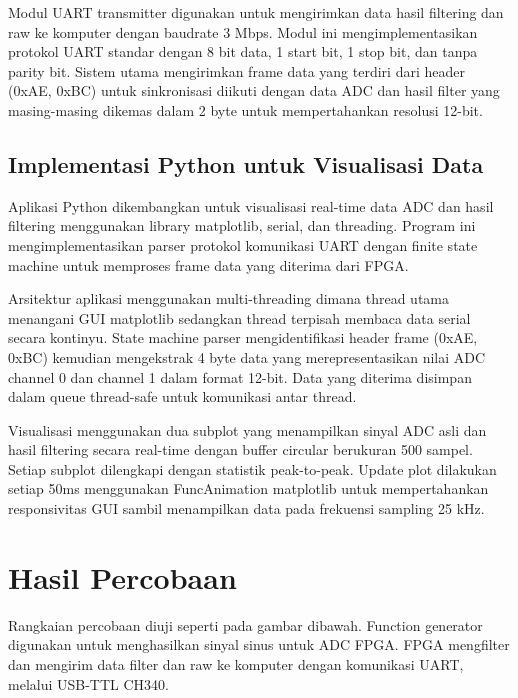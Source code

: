 \documentclass{article}
\begin{document}
Modul UART transmitter digunakan untuk mengirimkan data hasil filtering dan raw ke komputer dengan baudrate 3 Mbps.
Modul ini mengimplementasikan protokol UART standar dengan 8 bit data, 1 start bit, 1 stop bit, dan tanpa parity bit.
Sistem utama mengirimkan frame data yang terdiri dari header (0xAE, 0xBC) untuk sinkronisasi diikuti dengan data ADC dan hasil filter yang
masing-masing dikemas dalam 2 byte untuk mempertahankan resolusi 12-bit.

\subsection{Implementasi Python untuk Visualisasi Data}
Aplikasi Python dikembangkan untuk visualisasi real-time data ADC dan hasil filtering menggunakan library matplotlib,
serial, dan threading. Program ini mengimplementasikan parser protokol komunikasi UART dengan
finite state machine untuk memproses frame data yang diterima dari FPGA.

Arsitektur aplikasi menggunakan multi-threading dimana thread utama menangani GUI matplotlib sedangkan
thread terpisah membaca data serial secara kontinyu. State machine parser mengidentifikasi header frame (0xAE, 0xBC)
kemudian mengekstrak 4 byte data yang merepresentasikan nilai ADC channel 0 dan channel 1 dalam format 12-bit.
Data yang diterima disimpan dalam queue thread-safe untuk komunikasi antar thread.

Visualisasi menggunakan dua subplot yang menampilkan sinyal ADC asli dan hasil filtering secara real-time dengan
buffer circular berukuran 500 sampel. Setiap subplot dilengkapi dengan statistik peak-to-peak.
Update plot dilakukan setiap 50ms menggunakan FuncAnimation matplotlib untuk mempertahankan responsivitas GUI sambil menampilkan data pada frekuensi sampling 25 kHz.

\newpage
\section{Hasil Percobaan}
Rangkaian percobaan diuji seperti
pada gambar dibawah. Function generator
digunakan untuk
menghasilkan sinyal sinus
untuk ADC FPGA. FPGA mengfilter dan mengirim data
filter dan raw ke komputer dengan komunikasi UART, melalui USB-TTL CH340.
\end{document}
